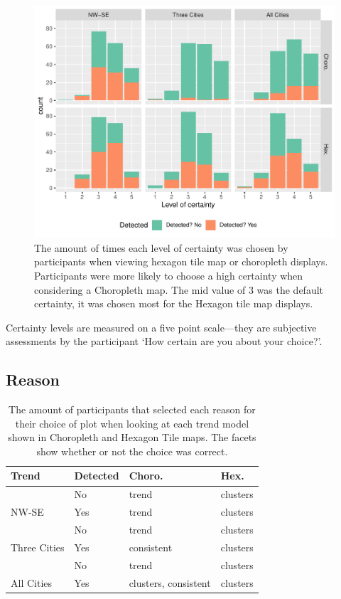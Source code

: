 \documentclass[conference,final,]{IEEEtran}
\makeatletter
\def\maxwidth{\ifdim\Gin@nat@width>\linewidth\linewidth
\else\Gin@nat@width\fi}
\let\Oldincludegraphics\includegraphics
\renewcommand{\includegraphics}[1]{\Oldincludegraphics[width=\maxwidth]{#1}}
\makeatother
\begin{document}
\begin{figure}
\centering
\includegraphics{paper_files/figure-latex/certainty-1.pdf}
\caption{\label{fig:certainty}The amount of times each level of certainty was chosen by participants when viewing hexagon tile map or choropleth displays. Participants were more likely to choose a high certainty when considering a Choropleth map. The mid value of 3 was the default certainty, it was chosen most for the Hexagon tile map displays.}
\end{figure}

Certainty levels are measured on a five point scale---they are subjective
assessments by the participant `How certain are you about your choice?'.

\hypertarget{reason}{%
\subsection{Reason}\label{reason}}

\begin{table}

\caption{\label{tab:reason}The amount of participants that selected each reason for their choice of plot when looking at each trend model shown in Choropleth and Hexagon Tile maps. The facets show whether or not the choice was correct.}
\centering
\begin{tabular}[t]{llll}
\toprule
Trend & Detected & Choro. & Hex.\\
\midrule
 & No & trend & clusters\\
\cmidrule{2-4}
\multirow{-2}{*}{\raggedright\arraybackslash NW-SE} & Yes & trend & clusters\\
\cmidrule{1-4}
 & No & trend & clusters\\
\cmidrule{2-4}
\multirow{-2}{*}{\raggedright\arraybackslash Three Cities} & Yes & consistent & clusters\\
\cmidrule{1-4}
 & No & trend & clusters\\
\cmidrule{2-4}
\multirow{-2}{*}{\raggedright\arraybackslash All Cities} & Yes & clusters, consistent & clusters\\
\bottomrule
\end{tabular}
\end{table}
\end{document}
